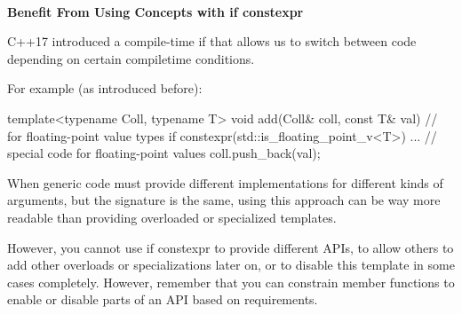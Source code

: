 \noindent
\hspace*{\fill} \\ %
\textbf{Benefit From Using Concepts with if constexpr}

C++17 introduced a compile-time if that allows us to switch between code depending on certain compiletime conditions.

For example (as introduced before):

\begin{cpp}
template<typename Coll, typename T>
void add(Coll& coll, const T& val) // for floating-point value types
{
	if constexpr(std::is_floating_point_v<T>) {
		... // special code for floating-point values
	}
	coll.push_back(val);
}
\end{cpp}

When generic code must provide different implementations for different kinds of arguments, but the signature is the same, using this approach can be way more readable than providing overloaded or specialized templates.

However, you cannot use if constexpr to provide different APIs, to allow others to add other overloads or specializations later on, or to disable this template in some cases completely. However, remember that you can constrain member functions to enable or disable parts of an API based on requirements.









